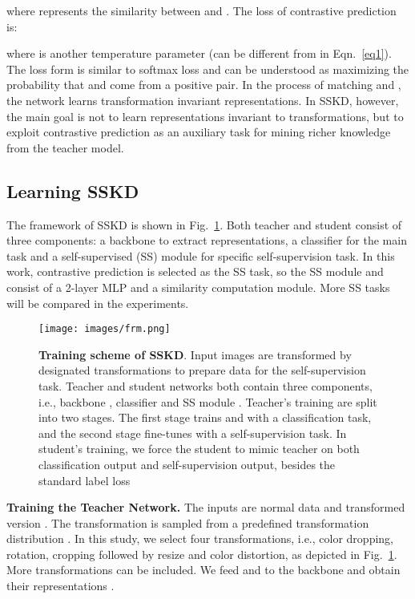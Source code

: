 \documentclass[runningheads]{llncs}
\newcommand{\ie}{i.e.}
\begin{document}
where  represents the similarity between  and .
The loss of contrastive prediction is:

where  is another temperature parameter (can be different from  in Eqn.~\eqref{eq1}). The loss form is similar to softmax loss and can be understood as maximizing the probability that  and  come from a positive pair. 
In the process of matching  and , the network learns transformation invariant representations. In SSKD, however, the main goal is not to learn representations invariant to transformations, but to exploit contrastive prediction as an auxiliary task for mining richer knowledge from the teacher model.




\subsection{Learning SSKD}
\label{sec:training_scheme}

The framework of SSKD is shown in Fig.~\ref{fig:frm}. Both teacher and student consist of three components: a backbone  to extract representations, a classifier  for the main task and a self-supervised (SS) module for specific self-supervision task. 
In this work, contrastive prediction is selected as the SS task, so the SS module  and  consist of a 2-layer MLP and a similarity computation module. More SS tasks will be compared in the experiments.


\begin{figure}[t]
	\centering
	\texttt{[image: images/frm.png]}
	\vspace{-10pt}
	\caption{\textbf{Training scheme of SSKD}. Input images are transformed by designated transformations to prepare data for the self-supervision task. Teacher and student networks both contain three components, i.e., backbone , classifier  and SS module . Teacher's training are split into two stages. The first stage trains  and  with a classification task, and the second stage fine-tunes  with a self-supervision task. In student's training, we force the student to mimic teacher on both classification output and self-supervision output, besides the standard label loss}
	\label{fig:frm}
\end{figure}

\vspace{0.1cm}
\noindent
\textbf{Training the Teacher Network.}
The inputs are normal data  and transformed version . 
The transformation  is sampled from a predefined transformation distribution . In this study, we select four transformations, \ie, color dropping, rotation, cropping followed by resize and color distortion, as depicted in Fig.~\ref{fig:frm}. More transformations can be included. We feed  and  to the backbone and obtain their representations . 
\end{document}
